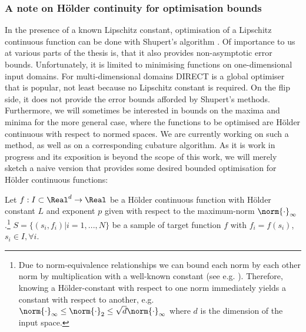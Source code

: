 \subsubsection{A note on H\"older continuity for optimisation bounds}
\label{sec:Hoelder_opt_basic_brief}
In the presence of a known Lipschitz constant, optimisation of a Lipschitz continuous function can be done with Shupert's algorithm \cite{Shubert:72}. Of importance to us at various parts of the thesis is, that it also provides non-asymptotic error bounds.  Unfortunately, it is limited to minimising functions on one-dimensional input domains. 
For multi-dimensional domains DIRECT \cite{direct:93} is a global optimiser that is popular, not least because no Lipschitz constant is required. On the flip side, it does not provide the error bounds afforded by Shupert's methods. Furthermore, we will sometimes be interested in bounds on the maxima and minima for the more general case, where the functions to be optimised are H\"older continuous with respect to normed spaces.  
We are currently working on such a method, as well as on a corresponding cubature algorithm. 
As it is work in progress and its exposition is beyond the scope of this work, we will merely sketch a naive version that provides some desired bounded optimisation for H\"older continuous functions:

Let $f: I \subset \Real^d \to \Real$ be a H\"older continuous function with H\"older constant $L$ and exponent $p$ given with respect to the maximum-norm $\norm{\cdot}_\infty$.\footnote{Due to norm-equivalence relationships we can bound each norm by each other norm by multiplication with a well-known constant (see e.g. \cite{koenigsberger:2000}). Therefore, knowing a H\"older-constant with respect to one norm immediately yields a constant with respect to another, e.g. $\norm{\cdot}_\infty \leq \norm{\cdot}_2 \leq \sqrt{d} \norm{\cdot}_\infty$ where $d$ is the dimension of the input space.}  
$S = \{(s_i, f_i) | i =1,...,N\} $ be a sample of target function $f$ with $f_i = f(s_i)$, $s_i \in I, \forall i$. 

